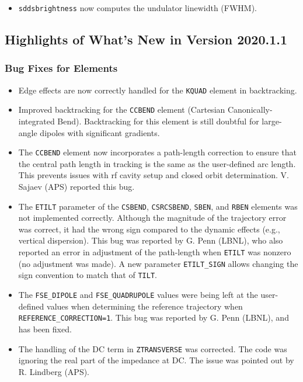 \documentclass[11pt]{article}
\begin{document}
\begin{itemize}
\item \verb|sddsbrightness| now computes the undulator linewidth (FWHM).
\end{itemize}


\subsection{Highlights of What's New in Version 2020.1.1}

\subsubsection{Bug Fixes for Elements}

\begin{itemize}
\item Edge effects are now correctly handled for the \verb|KQUAD| element in backtracking.
\item Improved backtracking for the \verb|CCBEND| element (Cartesian Canonically-integrated Bend). Backtracking
  for this element is still doubtful for large-angle dipoles with significant gradients.
\item The \verb|CCBEND| element now incorporates a path-length correction to ensure that the central path length
  in tracking is the same as the user-defined arc length. This prevents issues with rf cavity setup and closed orbit
  determination. V. Sajaev (APS) reported this bug.
\item The \verb|ETILT| parameter of the \verb|CSBEND|, \verb|CSRCSBEND|, \verb|SBEN|, and \verb|RBEN| elements was not
  implemented correctly. Although the magnitude of the trajectory error was correct, it had the wrong sign compared to the
  dynamic effects (e.g., vertical dispersion). This bug was reported by G. Penn (LBNL), who also reported an error in
  adjustment of the path-length when \verb|ETILT| was nonzero (no adjustment was made).
  A new parameter \verb|ETILT_SIGN| allows changing the sign convention to match that of \verb|TILT|.
\item The \verb|FSE_DIPOLE| and \verb|FSE_QUADRUPOLE| values were being left at the user-defined values when determining
  the reference trajectory when \verb|REFERENCE_CORRECTION=1|. This bug was reported by G. Penn (LBNL), and has been fixed.
\item The handling of the DC term in \verb|ZTRANSVERSE| was corrected. The code was ignoring the real part of the impedance
  at DC. The issue was pointed out by R. Lindberg (APS).

\end{itemize}
\end{document}

